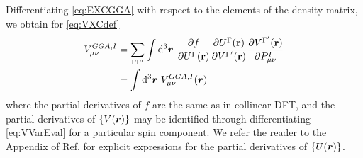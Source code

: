 Differentiating \cref{eq:EXCGGA} with respect to the elements of the density matrix, we obtain for \cref{eq:VXCdef}
\begin{align}
  \label{eq:VXCGGA_eval}
V^{GGA,I}_{\mu\nu} &= \sum_{\Gamma \Gamma'} \int \mathrm{d}^3 \boldsymbol{r} \text{  }
  \frac{\partial f }{\partial U^\Gamma(\mathbf{r})}
  \frac{\partial U^\Gamma(\mathbf{r})}{\partial V^{\Gamma'}(\mathbf{r})}
  \frac{\partial V^{\Gamma'}(\mathbf{r})}{\partial P^{I}_{\mu\nu}} \\ &= \nonumber \int \mathrm{d}^3 \boldsymbol{r} \text{  } V^{GGA,I}_{\mu\nu}(\boldsymbol{r})
\end{align}  
where the partial derivatives of $f$ are the same as in collinear DFT, and the partial derivatives of $\{V(\boldsymbol{r})\}$ may be
identified through differentiating \cref{eq:VVarEval} for a particular spin component. We refer the reader to the Appendix
of Ref.\cite{Li17_2591} for explicit expressions for the partial derivatives of $\{U(\boldsymbol{r})\}$.

